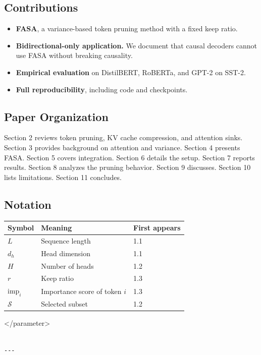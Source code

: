 \subsection{Contributions}

\begin{itemize}
\item \textbf{FASA}, a variance-based token pruning method with a fixed keep ratio.
\item \textbf{Bidirectional-only application.} We document that causal decoders
  cannot use FASA without breaking causality.
\item \textbf{Empirical evaluation} on DistilBERT, RoBERTa, and GPT-2 on SST-2.
\item \textbf{Full reproducibility}, including code and checkpoints.

\end{itemize}
\subsection{Paper Organization}

Section 2 reviews token pruning, KV cache compression, and attention sinks. 
Section 3 provides background on attention and variance. Section 4 presents 
FASA. Section 5 covers integration. Section 6 details the setup. Section 7 
reports results. Section 8 analyzes the pruning behavior. Section 9 
discusses. Section 10 lists limitations. Section 11 concludes.



\subsection{Notation}

\begin{table}[H]
\centering
\small
\begin{tabular}{lll}
\toprule
\textbf{Symbol} & \textbf{Meaning} & \textbf{First appears} \\
\midrule
$L$ & Sequence length & 1.1 \\
$d_h$ & Head dimension & 1.1 \\
$H$ & Number of heads & 1.2 \\
$r$ & Keep ratio & 1.3 \\
$\text{imp}_i$ & Importance score of token $i$ & 1.3 \\
$\mathcal{S}$ & Selected subset & 1.2 \\
\bottomrule
\end{tabular}
\end{table}
</parameter>
\begin{lstlisting}

---
\end{lstlisting}